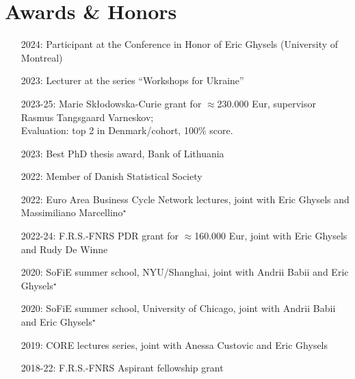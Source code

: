 \documentclass[10pt]{article}
\newcommand{\thestarnogap}{{\Large{\color{blue}\ensuremath{^\star}}}}
\begin{document}
	\section*{Awards \& Honors}
	\vspace{-0.5em}
	\begin{itemize}[leftmargin=4.5em]
		\setlength\itemsep{-0.1em}
		\item[2024:] Participant at the Conference in Honor of Eric Ghysels (University of Montreal)
		\item[2023:] Lecturer at the series ``Workshops for Ukraine''
		\item[2023-25:] Marie Skłodowska-Curie grant for $\approx$230.000 Eur, supervisor Rasmus Tangsgaard Varneskov; \\ %
		\hspace*{0.5em} Evaluation: top 2 in Denmark/cohort, 100\% score.
		\item[2023:] Best PhD thesis award, Bank of Lithuania
		\item[2022:] Member of Danish Statistical Society
		\item[2022:] Euro Area Business Cycle Network lectures, joint with Eric Ghysels and Massimiliano Marcellino\thestarnogap
		\item[2022-24:] F.R.S.-FNRS PDR grant for $\approx$160.000 Eur, joint with Eric Ghysels and Rudy De Winne
		\item[2020:] SoFiE summer school, NYU/Shanghai, joint with Andrii Babii and Eric Ghysels\thestarnogap
		\item[2020:] SoFiE summer school, University of Chicago, joint with Andrii Babii and Eric Ghysels\thestarnogap
		\item[2019:] CORE lectures series, joint with Anessa Custovic and Eric Ghysels
		\item[2018-22:] F.R.S.-FNRS Aspirant fellowship grant
	\end{itemize}
	
\end{document}
